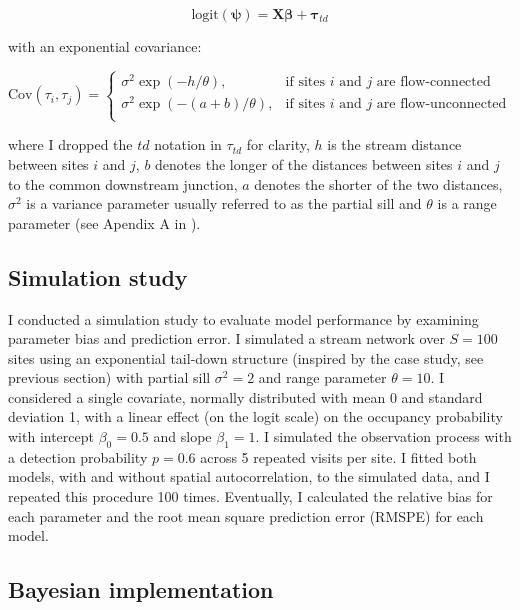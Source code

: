 \documentclass[
  11pt,
  a4paper,
]{article}
\begin{document}
\begin{equation}
\text{logit}(\boldsymbol{\psi}) = \mathbf{X} \boldsymbol{\beta} +\boldsymbol{\tau}_{td}
\end{equation}

with an exponential covariance:

\[
    \text{Cov}(\tau_{i},\tau_{j})=
\begin{cases}
    \displaystyle{\sigma^2\exp(-h/\theta)},& \text{if sites } i \text{ and } j \text{ are flow-connected }\\
    \displaystyle{\sigma^2\exp(-(a+b)/\theta)},& \text{if sites } i \text{ and } j \text{ are flow-unconnected }\\
\end{cases}
\]

where I dropped the \(td\) notation in \(\tau_{td}\) for clarity, \(h\) is the stream distance between sites \(i\) and \(j\), \(b\) denotes the longer of the distances between sites \(i\) and \(j\) to the common downstream junction, \(a\) denotes the shorter of the two distances, \(\sigma^2\) is a variance parameter usually referred to as the partial sill and \(\theta\) is a range parameter (see Apendix A in ).

\subsection{Simulation study}\label{simulation-study}

I conducted a simulation study to evaluate model performance by examining parameter bias and prediction error. I simulated a stream network over \(S = 100\) sites using an exponential tail-down structure (inspired by the case study, see previous section) with partial sill \(\sigma^2 = 2\) and range parameter \(\theta = 10\). I considered a single covariate, normally distributed with mean 0 and standard deviation 1, with a linear effect (on the logit scale) on the occupancy probability with intercept \(\beta_0 = 0.5\) and slope \(\beta_1 = 1\). I simulated the observation process with a detection probability \(p = 0.6\) across 5 repeated visits per site. I fitted both models, with and without spatial autocorrelation, to the simulated data, and I repeated this procedure 100 times. Eventually, I calculated the relative bias for each parameter and the root mean square prediction error (RMSPE) for each model.

\subsection{Bayesian implementation}\label{bayesian-implementation}
\end{document}
